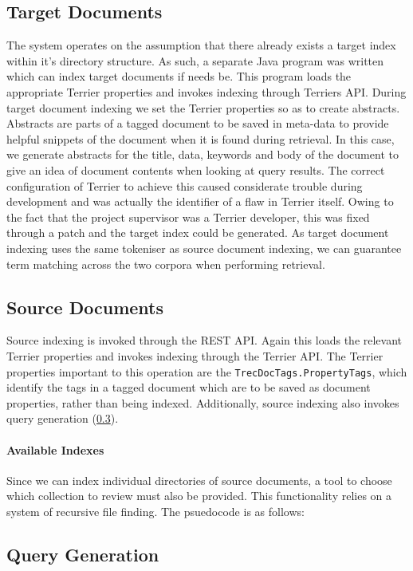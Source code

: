 \documentclass{l4proj}
\newcommand{\code}[1]{\texttt{#1}}
\begin{document}
\subsection{Target Documents}
The system operates on the assumption that there already exists a target index within it's directory structure.
As such, a separate Java program was written which can index target documents if needs be. This program loads the appropriate Terrier properties and invokes indexing through Terriers API. During target document indexing we set the Terrier properties so as to create abstracts. Abstracts are parts of a tagged document to be saved in meta-data to provide helpful snippets of the document when it is found during retrieval. In this case, we generate abstracts for the title, data, keywords and body of the document to give an idea of document contents when looking at query results.
The correct configuration of Terrier to achieve this caused considerate trouble during development and was actually the identifier of a flaw in Terrier itself. Owing to the fact that the project supervisor was a Terrier developer, this was fixed through a patch and the target index could be generated.
As target document indexing uses the same tokeniser as source document indexing, we can guarantee term matching across the two corpora when performing retrieval.

\subsection{Source Documents}
Source indexing is invoked through the REST API. Again this loads the relevant Terrier properties and invokes indexing through the Terrier API. The Terrier properties important to this operation are the \code{TrecDocTags.PropertyTags}, which identify the tags in a tagged document which are to be saved as document properties, rather than being indexed. Additionally, source indexing also invokes query generation (\ref{querygen}). 

\paragraph{Available Indexes}
Since we can index individual directories of source documents, a tool to choose which collection to review must also be provided. This functionality relies on a system of recursive file finding. The psuedocode is as follows:

\subsection{Query Generation} \label{querygen}
\end{document}
